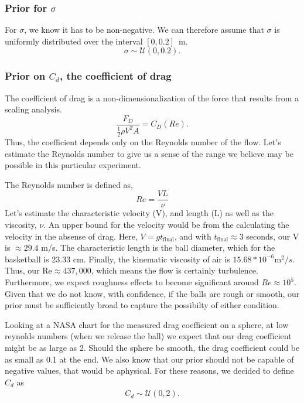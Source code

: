 \documentclass{article}
\begin{document}
\subsubsection*{Prior for $\sigma$}

For $\sigma$, we know it has to be non-negative. We can therefore
assume that $\sigma$ is uniformly distributed over the interval $[0,0.2]$~m.
\[
\sigma\sim\mathcal{U}(0,0.2).
\]



\subsubsection*{Prior on $C_{d}$, the coefficient of drag}

The coefficient of drag is a non-dimensionalization of the force that
results from a scaling analysis. 
\[
\frac{F_{D}}{\frac{1}{2}\rho V^{2}A}=C_{D}(Re).
\]
 Thus, the coefficient depends only on the Reynolds number of the
flow. Let's estimate the Reynolds number to give us a sense of the
range we believe may be possible in this particular experiment.

The Reynolds number is defined as, 
\[
Re=\frac{VL}{\nu}
\]
 Let's estimate the characteristic velocity (V), and length (L) as
well as the viscosity, $\nu$. An upper bound for the velocity would
be from the calculating the velocity in the absense of drag. Here,
$V=gt_{\text{final}}$, and with $t_{\text{final}}\approx3$ seconds,
our V is $\approx29.4$ m/s. The characteristic length is the ball
diameter, which for the basketball is 23.33 cm. Finally, the kinematic
viscosity of air is $15.68*10^{-6}\text{m}^{2}/s$. Thus, our $\text{Re}\approx437,000$,
which means the flow is certainly turbulence. Furthermore, we expect
roughness effects to become significant around $Re\approx10^{5}$.
Given that we do not know, with confidence, if the balls are rough
or smooth, our prior must be sufficiently broad to capture the possibilty
of either condition.

Looking at a NASA chart for the measured drag coefficient on a sphere,
at low reynolds numbers (when we release the ball) we expect that
our drag coefficient might be as large as 2. Should the sphere be
smooth, the drag coefficient could be as small as 0.1 at the end.
We also know that our prior should not be capable of negative values,
that would be aphysical. For these reasons, we decided to define $C_{d}$
as 
\begin{align*}
C_{d}\sim\mathcal{U}(0,2).
\end{align*}
\end{document}
